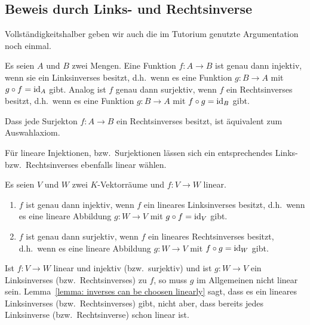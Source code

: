 \subsection{Beweis durch Links- und Rechtsinverse}

Vollständigkeitshalber geben wir auch die im Tutorium genutzte Argumentation noch einmal.

\begin{recall}
  Es seien $A$ und $B$ zwei Mengen.
  Eine Funktion $f \colon A \to B$ ist genau dann injektiv, wenn sie ein Linksinverses besitzt, d.h.\ wenn es eine Funktion $g \colon B \to A$ mit $g \circ f = \operatorname{id}_A$ gibt.
  Analog ist $f$ genau dann surjektiv, wenn $f$ ein Rechtsinverses besitzt, d.h.\ wenn es eine Funktion $g \colon B \to A$ mit $f \circ g = \operatorname{id}_B$ gibt.
\end{recall}

\begin{remark}
  Dass jede Surjekton $f \colon A \to B$ ein Rechtsinverses besitzt, ist äquivalent zum Auswahlaxiom.
\end{remark}

Für lineare Injektionen, bzw.\ Surjektionen lässen sich ein entsprechendes Links- bzw.\ Rechtsinverses ebenfalls linear wählen.

\begin{lemma}
  \label{lemma: inverses can be choosen linearly}
  Es seien $V$ und $W$ zwei $K$-Vektorräume und $f \colon V \to W$ linear.
  \begin{enumerate}
    \item
      $f$ ist genau dann injektiv, wenn $f$ ein lineares Linksinverses besitzt, d.h.\ wenn es eine lineare Abbildung $g \colon W \to V$ mit $g \circ f = \operatorname{id}_V$ gibt.
    \item
      $f$ ist genau dann surjektiv, wenn $f$ ein lineares Rechtsinverses besitzt, d.h.\ wenn es eine lineare Abbildung $g \colon W \to V$ mit $f \circ g = \operatorname{id}_W$ gibt.
  \end{enumerate}
\end{lemma}

\begin{warning}
  Ist $f \colon V \to W$ linear und injektiv (bzw.\ surjektiv) und ist $g \colon W \to V$ ein Linksinverses (bzw.\ Rechtsinverses) zu $f$, so muss $g$ im Allgemeinen nicht linear sein.
  Lemma~\ref{lemma: inverses can be choosen linearly} sagt, dass es ein lineares Linksinverses (bzw.\ Rechtsinverses) gibt, nicht aber, dass bereits jedes Linksinverse (bzw.\ Rechtsinverse) schon linear ist.
\end{warning}

